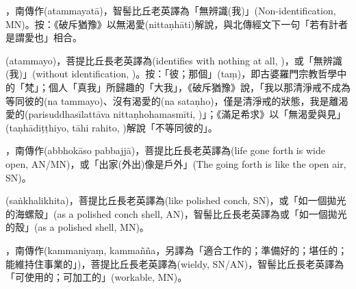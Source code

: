 \startitemgroup[noteitems]
\item{}，南傳作(atammayatā)，智髻比丘老英譯為「無辨識(我)」(Non-identification, MN)。按：《破斥猶豫》以無渴愛(nittaṇhāti)解說，與北傳經文下一句「若有計者是謂愛也」相合。
\item{}(atammayo)，菩提比丘長老英譯為(identifies with nothing at all, )，或「無辨識(我)」(without identification, )。按：「彼；那個」(taṃ)，即古婆羅門宗教哲學中的「梵」；個人「真我」所歸趣的「大我」，《破斥猶豫》說，「我以那清淨戒不成為等同彼的(na tammayo)、沒有渴愛的(na sataṇho)，僅是清淨戒的狀態，我是離渴愛的(parisuddhasīlattāva nittaṇhohamasmīti, )」；《滿足希求》以「無渴愛與見」(taṇhādiṭṭhiyo, tāhi rahito, )解說「不等同彼的」。
\stopitemgroup

\startitemgroup[noteitems]
\item{}，南傳作(abbhokāso pabbajjā)，菩提比丘長老英譯為(life gone forth is wide open, AN/MN)，或「出家(外出)像是戶外」(The going forth is like the open air, SN)。
\stopitemgroup

\startitemgroup[noteitems]
\item{}(saṅkhalikhita)，菩提比丘長老英譯為(like polished conch, SN)，或「如一個拋光的海螺殼」(as a polished conch shell, AN)，智髻比丘長老英譯為或「如一個拋光的殼」(as a polished shell, MN)。
\stopitemgroup

\startitemgroup[noteitems]
\item{}，南傳作(kammaniyaṃ, kammañña，另譯為「適合工作的；準備好的；堪任的；能維持住事業的」)，菩提比丘長老英譯為(wieldy, SN/AN)，智髻比丘長老英譯為「可使用的；可加工的」(workable, MN)。
\stopitemgroup

